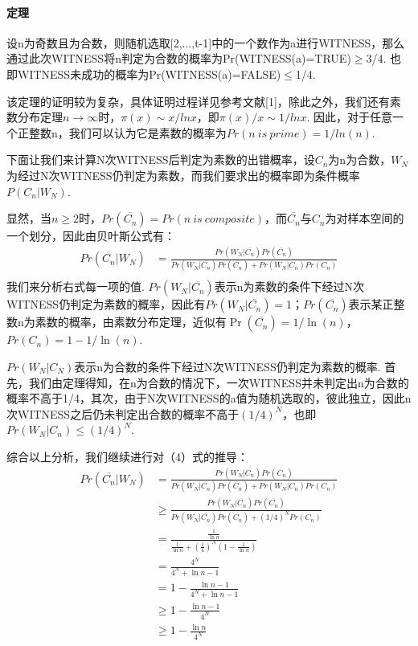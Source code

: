 \documentclass[UTF8]{ctexart}
\begin{document}
\paragraph*{定理} 设n为奇数且为合数，则随机选取[2,...,t-1]中的一个数作为a进行WITNESS，那么通过此次WITNESS将n判定为合数的概率为Pr(WITNESS(a)=TRUE)$\ge$3/4. 也即WITNESS未成功的概率为Pr(WITNESS(a)=FALSE)$\le$1/4.\ \\\par
该定理的证明较为复杂，具体证明过程详见参考文献[1]，除此之外，我们还有素数分布定理$n\to \infty$时，$\pi(x)\sim x/lnx$，即$\pi(x)/x\sim 1/lnx$. 因此，对于任意一个正整数n，我们可以认为它是素数的概率为$Pr(n\
 is\ prime)=1/ln(n)$.\par
下面让我们来计算N次WITNESS后判定为素数的出错概率，设$C_n$为n为合数，$W_N$为经过N次WITNESS仍判定为素数，而我们要求出的概率即为条件概率$P(C_n|W_N)$.\par
显然，当$n\ge 2$时，$Pr(\overline{C_n})=Pr(n\ is\ composite)$，而$\overline{C_n}$与$C_n$为对样本空间的一个划分，因此由贝叶斯公式有：
\begin{equation}
    \begin{split}
        Pr(\overline{C_n}|W_N)&=\frac{Pr(W_N|\overline{C_n})Pr(\overline{C_n})}{Pr(W_N|\overline{C_n})Pr(\overline{C_n})+Pr(W_N|C_n)Pr(C_n)}\\
    \end{split}
\end{equation}
我们来分析右式每一项的值. $Pr(W_N|\overline{C_n})$表示n为素数的条件下经过N次WITNESS仍判定为素数的概率，因此有$Pr(W_N|\overline{C_n})=1$；$Pr(\overline{C_n})$表示某正整数n为素数的概率，由素数分布定理，近似有$\Pr(\overline{C_n})=1/\ln(n)$，$Pr(C_n)=1-1/\ln(n)$. \par
$Pr(W_N|C_N)$表示n为合数的条件下经过N次WITNESS仍判定为素数的概率. 首先，我们由定理得知，在n为合数的情况下，一次WITNESS并未判定出n为合数的概率不高于1/4，其次，由于N次WITNESS的a值为随机选取的，彼此独立，因此n次WITNESS之后仍未判定出合数的概率不高于$(1/4)^N$，也即$Pr(W_N|{C_n})\le (1/4)^N$.\par
综合以上分析，我们继续进行对（4）式的推导：
\begin{equation}
    \begin{split}
        Pr(\overline{C_n}|W_N)&=\frac{Pr(W_N|\overline{C_n})Pr(\overline{C_n})}{Pr(W_N|\overline{C_n})Pr(\overline{C_n})+Pr(W_N|C_n)Pr(C_n)}\\
        &\ge \frac{Pr(W_N|\overline{C_n})Pr(\overline{C_n})}{Pr(W_N|\overline{C_n})Pr(\overline{C_n})+(1/4)^NPr(C_n)}\\
        &=\frac{\frac{1}{\ln n}}{\frac{1}{\ln n}+(\frac{1}{4})^N(1-\frac{1}{\ln n})}\\
        &=\frac{4^N}{4^N+\ln n-1}\\
        &=1-\frac{\ln n -1 }{4^N+\ln n-1}\\
        &\ge 1-\frac{\ln n - 1}{4^N}\\
        &\ge 1-\frac{\ln n}{4^N}
    \end{split}
\end{equation}
\end{document}
